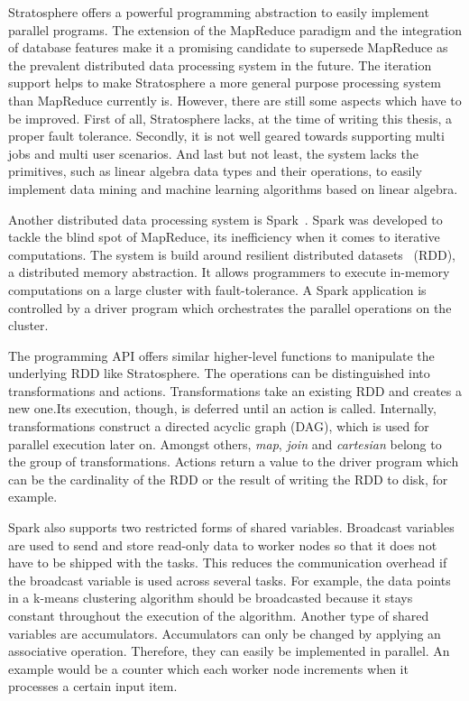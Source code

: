 Stratosphere offers a powerful programming abstraction to easily implement parallel programs.
The extension of the MapReduce paradigm and the integration of database features make it a promising candidate to supersede MapReduce as the prevalent distributed data processing system in the future.
The iteration support helps to make Stratosphere a more general purpose processing system than MapReduce currently is.
However, there are still some aspects which have to be improved.
First of all, Stratosphere lacks, at the time of writing this thesis, a proper fault tolerance.
Secondly, it is not well geared towards supporting multi jobs and multi user scenarios.
And last but not least, the system lacks the primitives, such as linear algebra data types and their operations, to easily implement data mining and machine learning algorithms based on linear algebra.

Another distributed data processing system is Spark~\cite{zaharia:2010a}.
Spark was developed to tackle the blind spot of MapReduce, its inefficiency when it comes to iterative computations.
The system is build around resilient distributed datasets~\cite{zaharia:2012a} (RDD), a distributed memory abstraction.
It allows programmers to execute in-memory computations on a large cluster with fault-tolerance.
A Spark application is controlled by a driver program which orchestrates the parallel operations on the cluster.

The programming API offers similar higher-level functions to manipulate the underlying RDD like Stratosphere.
The operations can be distinguished into transformations and actions.
Transformations take an existing RDD and creates a new one.Its execution, though, is deferred until an action is called.
Internally, transformations construct a directed acyclic graph (DAG), which is used for parallel execution later on.
Amongst others, \emph{map}, \emph{join} and \emph{cartesian} belong to the group of transformations.
Actions return a value to the driver program which can be the cardinality of the RDD or the result of writing the RDD to disk, for example.

Spark also supports two restricted forms of shared variables.
Broadcast variables are used to send and store read-only data to worker nodes so that it does not have to be shipped with the tasks.
This reduces the communication overhead if the broadcast variable is used across several tasks.
For example, the data points in a k-means clustering algorithm should be broadcasted because it stays constant throughout the execution of the algorithm.
Another type of shared variables are accumulators.
Accumulators can only be changed by applying an associative operation.
Therefore, they can easily be implemented in parallel.
An example would be a counter which each worker node increments when it processes a certain input item.

